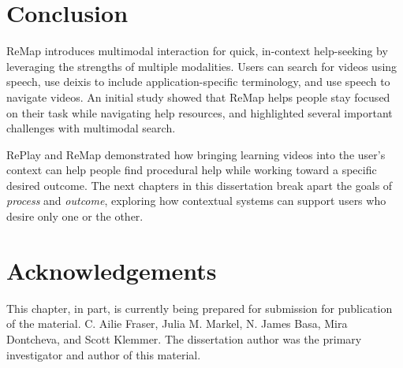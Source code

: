 \section{Conclusion}
ReMap introduces multimodal interaction for quick, in-context help-seeking by leveraging the strengths of multiple modalities. Users can search for videos using speech, use deixis to include application-specific terminology, and use speech to navigate videos. An initial study showed that ReMap helps people stay focused on their task while navigating help resources, and highlighted several important challenges with multimodal search. 

RePlay and ReMap demonstrated how bringing learning videos into the user's context can help people find procedural help while working toward a specific desired outcome. The next chapters in this dissertation break apart the goals of \textit{process} and \textit{outcome}, exploring how contextual systems can support users who desire only one or the other.

\section{Acknowledgements}
This chapter, in part, is currently being prepared for submission for publication of the material. C. Ailie Fraser, Julia M. Markel, N. James Basa, Mira Dontcheva, and Scott Klemmer. The dissertation author was the primary investigator and author of this material.
